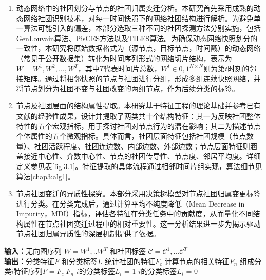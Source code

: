 \begin{enumerate}
\item 动态网络中的社团划分与节点的社团归属变迁分析。本研究首先采用成熟的动态网络社团识别技术，对每一时间快照下的网络社团结构进行解析。为避免单一算法可能引入的偏差，本部分选取三种不同的社团探测方法分别实施，包括GenLouvain算法\cite{GenLouvain}、PisCES方法\cite{PisCes}以及TILES算法\cite{rossetti2017tiles}。为确保动态网络快照划分的一致性，本研究将原始数据格式为（源节点，目标节点，时间戳）的动态网络（常见于公开数据集）转化为时间序列形式的网络切片结构，表示为$W={W^1, W^2, \dots, W^T}$，其中$T$代表时间片总数，$W^t \in {0,1}^{N \times N}$则为第$t$时刻的邻接矩阵。通过将相邻快照的节点与社团进行分组，形成多组连续快照网络，并将节点划分为社团不变与社团改变的两组节点，作为后续分类的标签。

\item 节点及社团层面的结构属性提取。本研究基于特征工程的理论基础并参考已有文献的经验性成果\cite{ilhan2016feature}，设计并提取了两类共十个结构特征：其一为反映社团整体特性的五个宏观指标，用于探讨社团对节点行为的潜在影响；其二为描述节点个体属性的五个微观指标。具体而言，社团层面特征包括社团规模（节点数量）、社团活跃程度、社团连边数、内部边数、外部边数；节点层面特征则涵盖接近中心性、介数中心性、节点的社团传导性、节点度、邻居平均度。详细定义参见表\ref{fig.3.1}。特征提取的具体流程通过相邻时间片组实现，算法细节见算法\ref{chap3:alg1}。

\item 节点社团变迁的异质性探究。本部分采用决策树模型对节点社团归属变更标签进行分类。在分类完成后，通过计算平均不纯度降低（Mean Decrease in Impurity，MDI）指标，评估各特征在分类任务中的贡献度，从而量化不同结构属性在节点社团变迁过程中的相对重要性。这一分析结果进一步为揭示驱动节点社团归属异质性的深层机制提供了依据。
\end{enumerate}

\begin{algorithm}[H]
	\caption{特征提取算法}
	\label{chap3:alg1}
	\begin{algorithmic}[1]
		\STATE \textbf{输入：}\quad 无向图序列 $W = {W}^1,..{W}^T$ 和社团标签 $\mathcal{C} = \mathcal{C}^1,...\mathcal{C}^T$\\
		\STATE \textbf{输出：}\quad 分类特征$F$ 和分类标签$L$
		\STATE 统计社团的特征$F_c$
		\STATE 计算节点的相关特征$F_n$
		\STATE 组成分类$i$特征序列$F = F_c \vert F_n$
		\STATE $i$的分类标签$L_i$ = 1
		\ELSE
		\STATE $i$的分类标签$L_i$ = 0
		\ENDIF
		\ENDFOR
		\ENDFOR
		\ENDFOR
	\end{algorithmic}
\end{algorithm}


